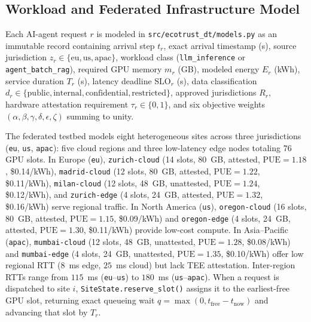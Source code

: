 \documentclass[conference]{IEEEtran}
\begin{document}
\subsection{Workload and Federated Infrastructure Model}
Each AI-agent request $r$ is modeled in \texttt{src/ecotrust\_dt/models.py} as an immutable record containing arrival step $t_r$, exact arrival timestamp (s), source jurisdiction $z_r \in \{\text{eu}, \text{us}, \text{apac}\}$, workload class (\texttt{llm\_inference} or \texttt{agent\_batch\_rag}), required GPU memory $m_r$ (GB), modeled energy $E_r$ (kWh), service duration $T_r$ (s), latency deadline $\mathrm{SLO}_r$ (s), data classification $d_r \in \{\text{public}, \text{internal}, \text{confidential}, \text{restricted}\}$, approved jurisdictions $R_r$, hardware attestation requirement $\tau_r \in \{0,1\}$, and six objective weights $(\alpha,\beta,\gamma,\delta,\epsilon,\zeta)$ summing to unity.

The federated testbed models eight heterogeneous sites across three jurisdictions (\texttt{eu}, \texttt{us}, \texttt{apac}): five cloud regions and three low-latency edge nodes totaling 76 GPU slots. In Europe (\texttt{eu}), \texttt{zurich-cloud} (14 slots, 80~GB, attested, $\mathrm{PUE}=1.18$, \$0.14/kWh), \texttt{madrid-cloud} (12 slots, 80~GB, attested, $\mathrm{PUE}=1.22$, \$0.11/kWh), \texttt{milan-cloud} (12 slots, 48~GB, unattested, $\mathrm{PUE}=1.24$, \$0.12/kWh), and \texttt{zurich-edge} (4 slots, 24~GB, attested, $\mathrm{PUE}=1.32$, \$0.16/kWh) serve regional traffic. In North America (\texttt{us}), \texttt{oregon-cloud} (16 slots, 80~GB, attested, $\mathrm{PUE}=1.15$, \$0.09/kWh) and \texttt{oregon-edge} (4 slots, 24~GB, attested, $\mathrm{PUE}=1.30$, \$0.11/kWh) provide low-cost compute. In Asia--Pacific (\texttt{apac}), \texttt{mumbai-cloud} (12 slots, 48~GB, unattested, $\mathrm{PUE}=1.28$, \$0.08/kWh) and \texttt{mumbai-edge} (4 slots, 24~GB, unattested, $\mathrm{PUE}=1.35$, \$0.10/kWh) offer low regional RTT ($8$~ms edge, $25$~ms cloud) but lack TEE attestation. Inter-region RTTs range from $115$~ms (\texttt{eu}--\texttt{us}) to $180$~ms (\texttt{us}--\texttt{apac}). When a request is dispatched to site $i$, \texttt{SiteState.reserve\_slot()} assigns it to the earliest-free GPU slot, returning exact queueing wait $q = \max(0, t_{\mathrm{free}} - t_{\mathrm{now}})$ and advancing that slot by $T_r$.
\end{document}
